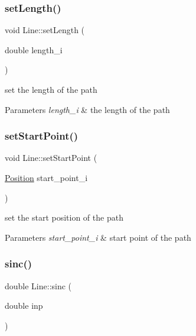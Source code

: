 \subsubsection{\texorpdfstring{set\+Length()}{setLength()}}
{\footnotesize\ttfamily void Line\+::set\+Length (\begin{DoxyParamCaption}\item[{double}]{length\+\_\+i }\end{DoxyParamCaption})}



set the length of the path 


\begin{DoxyParams}{Parameters}
{\em length\+\_\+i} & the length of the path \\
\hline
\end{DoxyParams}
\mbox{\label{class_line_a6356eecffc24d5016c9aa697611c3020}} 
\subsubsection{\texorpdfstring{set\+Start\+Point()}{setStartPoint()}}
{\footnotesize\ttfamily void Line\+::set\+Start\+Point (\begin{DoxyParamCaption}\item[{\mbox{\hyperlink{class_position}{Position}}}]{start\+\_\+point\+\_\+i }\end{DoxyParamCaption})}



set the start position of the path 


\begin{DoxyParams}{Parameters}
{\em start\+\_\+point\+\_\+i} & start point of the path \\
\hline
\end{DoxyParams}
\mbox{\label{class_line_a4976ad80d3fe4a789bac7a1916543edd}} 
\subsubsection{\texorpdfstring{sinc()}{sinc()}}
{\footnotesize\ttfamily double Line\+::sinc (\begin{DoxyParamCaption}\item[{double}]{inp }\end{DoxyParamCaption})}



